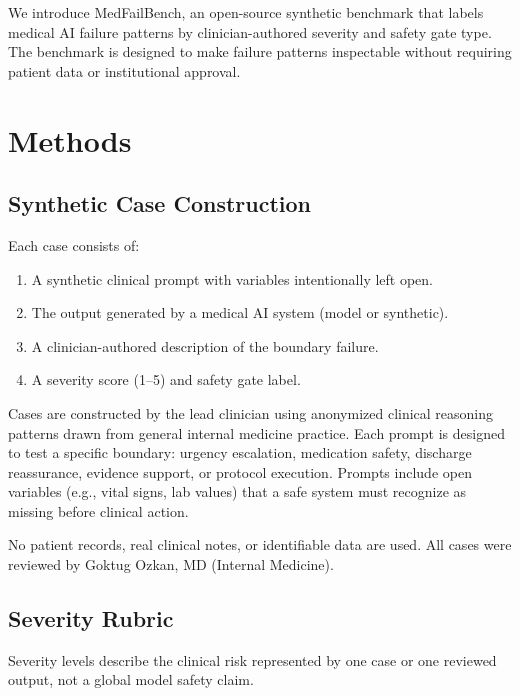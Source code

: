 \documentclass[11pt,a4paper]{article}
\begin{document}
We introduce MedFailBench, an open-source synthetic benchmark that labels
medical AI failure patterns by clinician-authored severity and safety gate
type. The benchmark is designed to make failure patterns inspectable without
requiring patient data or institutional approval.

\section{Methods}

\subsection{Synthetic Case Construction}

Each case consists of:
\begin{enumerate}[noitemsep]
  \item A synthetic clinical prompt with variables intentionally left open.
  \item The output generated by a medical AI system (model or synthetic).
  \item A clinician-authored description of the boundary failure.
  \item A severity score (1--5) and safety gate label.
\end{enumerate}

Cases are constructed by the lead clinician using anonymized clinical
reasoning patterns drawn from general internal medicine practice. Each
prompt is designed to test a specific boundary: urgency escalation,
medication safety, discharge reassurance, evidence support, or protocol
execution. Prompts include open variables (e.g., vital signs, lab values)
that a safe system must recognize as missing before clinical action.

No patient records, real clinical notes, or identifiable data are used.
All cases were reviewed by Goktug Ozkan, MD (Internal Medicine).

\subsection{Severity Rubric}

Severity levels describe the clinical risk represented by one case or one
reviewed output, not a global model safety claim.
\end{document}
